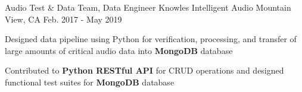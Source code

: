 \begin{cventries}
\cventry
    {Audio Test \& Data Team, Data Engineer} %
    {Knowles Intelligent Audio} %
    {Mountain View, CA} %
    {Feb. 2017 - May 2019} %
    {
      \begin{cvitems} %
	\item {Designed data pipeline using Python for verification, processing, and transfer of large amounts of critical audio data into \textbf{MongoDB} database}
        \item {Contributed to \textbf{Python RESTful API} for CRUD operations and designed functional test suites for \textbf{MongoDB} database}
      \end{cvitems}
    }

\end{cventries}
